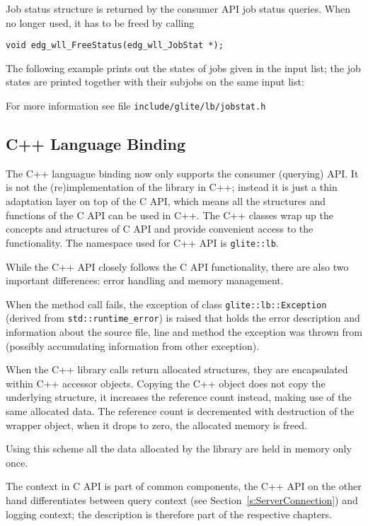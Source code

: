 Job status structure is returned by the \LB consumer API job status
queries. When no longer used, it has to be freed by calling
\begin{lstlisting}
void edg_wll_FreeStatus(edg_wll_JobStat *);
\end{lstlisting}

The following example prints out the states of jobs given in the input
list; the job states are printed together with their subjobs on the
same input list:


For more information see file \verb'include/glite/lb/jobstat.h'

\subsection{C++ Language Binding}
The C++ languague binding now only supports the consumer (querying)
API. It is not the (re)implementation of the library in C++; instead
it is just a thin adaptation layer on top of the C API, which means
all the structures and functions of the C API can be used in C++. The
C++ classes wrap up the concepts and structures of C API and provide
convenient access to the functionality. The namespace used for 
\LB C++ API is \verb'glite::lb'.

%
While the C++ API closely follows the C API functionality, there are
also two important differences: error handling and memory management.

When the \LB method call fails, the exception of class 
\verb'glite::lb::Exception' (derived from \verb'std::runtime_error')
is raised that holds the error description and information about the
source file, line and method the exception was thrown from (possibly
accumulating information from other exception). 

%
When the C++ \LB library calls return allocated structures, they are
encapsulated within C++ accessor objects. Copying the C++ object does
not copy the underlying structure, it increases the reference count
instead, making use of the same allocated data. The reference count is
decremented with destruction of the wrapper object, when it drops to
zero, the allocated memory is freed. 

Using this scheme all the data allocated by the \LB library are held
in memory only once.

%
The context in C API is part of common components, the C++ API on the
other hand differentiates between query context
(see Section~\ref{s:ServerConnection}) and logging context; the description is
therefore part of the respective chapters.

